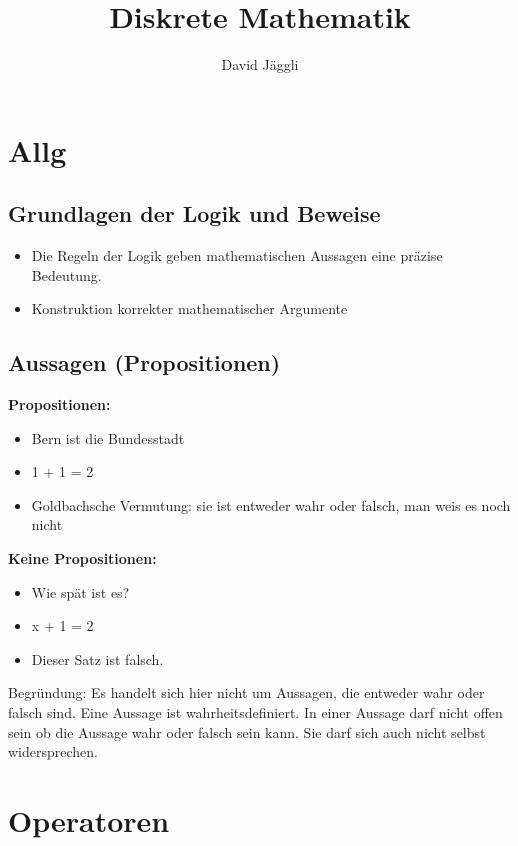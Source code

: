 \documentclass[12pt]{scrartcl}
\author{David Jäggli}
\title{Diskrete Mathematik}
\begin{document}
\maketitle

\tableofcontents

\newpage
\section{Allg}

\subsection{Grundlagen der Logik und Beweise}

\begin{itemize}
    \item Die Regeln der Logik geben mathematischen Aussagen eine präzise Bedeutung.
    \item Konstruktion korrekter mathematischer Argumente
\end{itemize}

\subsection{Aussagen (Propositionen)}
\textbf{Propositionen:}
\begin{itemize}
    \item Bern ist die Bundesstadt
    \item 1 + 1 = 2
    \item Goldbachsche Vermutung: sie ist entweder wahr oder falsch, man weis es noch nicht
\end{itemize}

\textbf{Keine Propositionen:}
\begin{itemize}
    \item Wie spät ist es?
    \item x + 1 = 2
    \item Dieser Satz ist falsch.
\end{itemize}

Begründung: Es handelt sich hier nicht um Aussagen, die entweder wahr oder falsch sind.
Eine Aussage ist wahrheitsdefiniert. In einer Aussage darf nicht offen sein ob die Aussage wahr oder 
falsch sein kann. Sie darf sich auch nicht selbst widersprechen.

\section{Operatoren}
\end{document}

